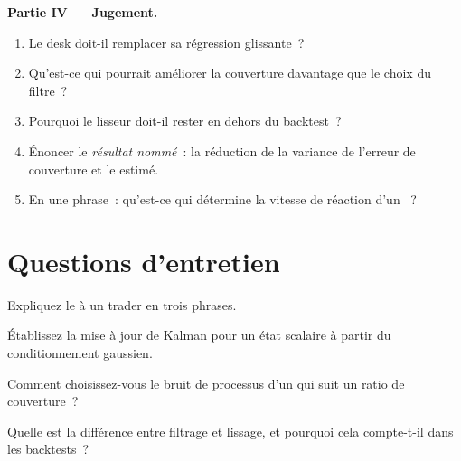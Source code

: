 \begin{problem}
\medskip\noindent\textbf{Partie IV --- Jugement.}
\begin{enumerate}[resume]
\item Le desk doit-il remplacer sa régression glissante~?
\item Qu'est-ce qui pourrait améliorer la couverture davantage que le choix du filtre~?
\item Pourquoi le lisseur doit-il rester en dehors du backtest~?
\item Énoncer le \emph{résultat nommé}~: la réduction de la variance de l'erreur de couverture et le  estimé.
\item En une phrase~: qu'est-ce qui détermine la vitesse de réaction d'un ~?
\end{enumerate}
\end{problem}

\section{Questions d'entretien}

\begin{interviewq}\label{iq:qm:state-space-models-and-the-kalman-filter:1}
Expliquez le  à un trader en trois phrases.
\end{interviewq}

\begin{interviewq}\label{iq:qm:state-space-models-and-the-kalman-filter:2}
Établissez la mise à jour de Kalman pour un état scalaire à partir du conditionnement gaussien.
\end{interviewq}

\begin{interviewq}\label{iq:qm:state-space-models-and-the-kalman-filter:3}
Comment choisissez-vous le bruit de processus d'un  qui suit un ratio de couverture~?
\end{interviewq}

\begin{interviewq}\label{iq:qm:state-space-models-and-the-kalman-filter:4}
Quelle est la différence entre filtrage et lissage, et pourquoi cela compte-t-il dans les backtests~?
\end{interviewq}

